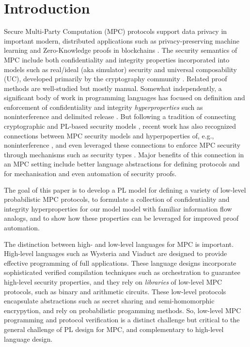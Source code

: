 \section{Introduction}

Secure Multi-Party Computation (MPC) protocols support data privacy in
important modern, distributed applications such as privacy-preserving
machine learning \cite{li2021privacy, knott2021crypten,
  koch2020privacy, liu2020privacy} and Zero-Knowledge proofs in
blockchains \cite{ishai2009zero, lu2019honeybadgermpc,
  gao2022symmeproof, tomaz2020preserving}. The security semantics of
MPC include both confidentiality and integrity properties incorporated
into models such as real/ideal (aka simulator) security and universal
composability (UC), developed primarily by the cryptography community
\cite{XXX}.  Related proof methods are well-studied \cite{Lindell2017}
but mostly manual. Somewhat independently, a significant
body of work in programming languages has focused on definition and
enforcement of confidentiality and integrity \emph{hyperproperties}
\cite{10.5555/1891823.1891830} such as noninterference and delimited
release \cite{XXX}. But following a tradition of connecting
cryptographic and PL-based security models \cite{XXX}, recent work has
also recognized connections between MPC security models and
hyperpoperties of, e.g., noninterference \cite{XXX}, and even
leveraged these connections to enforce MPC security through mechanisms
such as security types \cite{XXX}. Major benefits of this connection
in an MPC setting include better language abstractions for defining
protocols and for mechanisation and even automation of security proofs.

The goal of this paper is to develop a PL model for defining a variety of
low-level probabilistic MPC protocols, to formulate a collection
of confidentiality and integrity hyperproperties for our model
model with familiar information flow analogs, and to show how these
properties can be leveraged for improved proof automation.

The distinction between high- and low-level languages for MPC is
important. High-level languages such as Wysteria \cite{XXX} and
Viaduct \cite{XXX} are designed to provide effective programming of
full applications. These language designs incorporate sophisticated
verified compilation techniques such as orchestration \cite{XXX} to
guarantee high-level security properties, and they rely on
\emph{libraries} of low-level MPC protocols, such as binary and
arithmetic circuits. These low-level protocols encapsulate
abstractions such as secret sharing and semi-homomorphic encrypytion,
and rely on probabilistic progamming methods. So, low-level MPC
programming and protocol verification is a distinct challenge but
critical to the general challenge of PL design for MPC, and complementary
to high-level language design.


